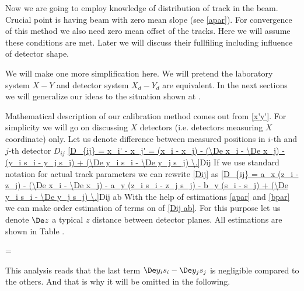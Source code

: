 Now we are going to employ knowledge of distribution of track in the beam. Crucial point is
having beam with zero mean slope (see \equ{} \ref{apar}). For convergence of this method we
also need zero mean offset of the tracks. Here we will assume these conditions are met. Later we will discuss their fullfiling including influence of detector shape.

We will make one more simplification here. We will pretend the laboratory system $X-Y$ and detector system $X_d-Y_d$ are equivalent. In the next sections we will generalize our ideas to the situation shown at \fg{} .


Mathematical description of our calibration method comes out from \equ{} \ref{x'y'}. For simplicity we will go on
discussing $X$ detectors (i.e. detectors measuring $X$ coordinate) only. Let us denote difference between measured positions in $i$-th
and $j$-th detector $D_{ij}$
\eqref{D_{ij} = x_i' - x_j' = (x_i - x_j) - (\De x_i - \De x_j) - (y_i s_i - y_j s_j) + (\De y_i s_i - \De y_j s_j) \.}{Dij}
If we use standard notation for actual track parameters
we can rewrite \equ{} \ref{Dij} as
\eqref{D_{ij} = a_x (z_i - z_j) - (\De x_i - \De x_j) - a_y (z_i s_i - z_j s_j) - b_y (s_i - s_j) + (\De y_i s_i - \De y_j s_j) \.}{Dij ab}
With the help of estimations \ref{apar} and \ref{bpar} we can make order estimation of terms on
\rhs{} of \equ{} \ref{Dij ab}. For this purpose let us denote $\De z$ a typical $z$ distance
between detector planes. All estimations are shown in Table .

{\setbox\strutbox=\hbox{\vrule height14pt depth6pt width0pt}
}

This analysis reads that the last term $\De y_i s_i - \De y_j s_j$ is negligible compared to the
others. And that is why it will be omitted in the following.

